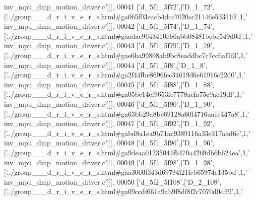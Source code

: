 \begin{DoxyCode}
{      inv\_mpu\_dmp\_motion\_driver.c'}]]],
00041   [\textcolor{stringliteral}{'d\_5f1\_5f72'},[\textcolor{stringliteral}{'D\_1\_72'},[\textcolor{stringliteral}{'../group\_\_\_d\_r\_i\_v\_e\_r\_s.html#ga065f93eacb4dcc7020cc21146e533110'},1,\textcolor{stringliteral}{'
      inv\_mpu\_dmp\_motion\_driver.c'}]]],
00042   [\textcolor{stringliteral}{'d\_5f1\_5f74'},[\textcolor{stringliteral}{'D\_1\_74'},[\textcolor{stringliteral}{'../group\_\_\_d\_r\_i\_v\_e\_r\_s.html#gaadac9643410cb6abb08481bebc549d0d'},1,\textcolor{stringliteral}{'
      inv\_mpu\_dmp\_motion\_driver.c'}]]],
00043   [\textcolor{stringliteral}{'d\_5f1\_5f79'},[\textcolor{stringliteral}{'D\_1\_79'},[\textcolor{stringliteral}{'../group\_\_\_d\_r\_i\_v\_e\_r\_s.html#gae6ba99808ab9bc8eaddbc7c7cc6af1f3'},1,\textcolor{stringliteral}{'
      inv\_mpu\_dmp\_motion\_driver.c'}]]],
00044   [\textcolor{stringliteral}{'d\_5f1\_5f8'},[\textcolor{stringliteral}{'D\_1\_8'},[\textcolor{stringliteral}{'../group\_\_\_d\_r\_i\_v\_e\_r\_s.html#ga2f44fbe8696fcc34619d6e61916c22d0'},1,\textcolor{stringliteral}{'
      inv\_mpu\_dmp\_motion\_driver.c'}]]],
00045   [\textcolor{stringliteral}{'d\_5f1\_5f88'},[\textcolor{stringliteral}{'D\_1\_88'},[\textcolor{stringliteral}{'../group\_\_\_d\_r\_i\_v\_e\_r\_s.html#ga05bc14cf9653fc7778acfa75c9ac19df'},1,\textcolor{stringliteral}{'
      inv\_mpu\_dmp\_motion\_driver.c'}]]],
00046   [\textcolor{stringliteral}{'d\_5f1\_5f90'},[\textcolor{stringliteral}{'D\_1\_90'},[\textcolor{stringliteral}{'../group\_\_\_d\_r\_i\_v\_e\_r\_s.html#ga63bb29a8be69128a60f4716aacc447a8'},1,\textcolor{stringliteral}{'
      inv\_mpu\_dmp\_motion\_driver.c'}]]],
00047   [\textcolor{stringliteral}{'d\_5f1\_5f92'},[\textcolor{stringliteral}{'D\_1\_92'},[\textcolor{stringliteral}{'../group\_\_\_d\_r\_i\_v\_e\_r\_s.html#gabd8a1ea9b71ac9389116a33e317aad6c'},1,\textcolor{stringliteral}{'
      inv\_mpu\_dmp\_motion\_driver.c'}]]],
00048   [\textcolor{stringliteral}{'d\_5f1\_5f96'},[\textcolor{stringliteral}{'D\_1\_96'},[\textcolor{stringliteral}{'../group\_\_\_d\_r\_i\_v\_e\_r\_s.html#ga9deaa01235044f6470a4269db6b624ea'},1,\textcolor{stringliteral}{'
      inv\_mpu\_dmp\_motion\_driver.c'}]]],
00049   [\textcolor{stringliteral}{'d\_5f1\_5f98'},[\textcolor{stringliteral}{'D\_1\_98'},[\textcolor{stringliteral}{'../group\_\_\_d\_r\_i\_v\_e\_r\_s.html#gaa3060f343d69794f21fcb65974c135bd'},1,\textcolor{stringliteral}{'
      inv\_mpu\_dmp\_motion\_driver.c'}]]],
00050   [\textcolor{stringliteral}{'d\_5f2\_5f108'},[\textcolor{stringliteral}{'D\_2\_108'},[\textcolor{stringliteral}{'../group\_\_\_d\_r\_i\_v\_e\_r\_s.html#ga09ccdf661a9ab9f8df8f2c7070d0dff9'},1,\textcolor{stringliteral}{'
}
\end{DoxyCode}
